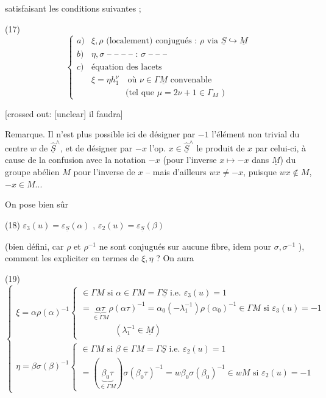 satisfaisant les conditions suivantes ;

\newpage


(17) 
$$ \begin{cases} 
a) & \xi, \rho \text{ (localement) conjugués : } \rho \text{ via } \underline{S} \hookrightarrow \underline{M} \\ 
b) & \eta, \sigma \text{ -- -- -- -- : } \sigma \text{ -- -- -- } \\ 
c) & \text{équation des lacets} \\ 
& \xi = \eta h_1^\nu \quad \text{où } \nu \in \Gamma \underline{M} \text{ convenable} \\ 
& \quad \quad \quad \quad \text{(tel que } \mu = 2\nu+1 \in \Gamma_M \text{ )} 
\end{cases} $$

[crossed out: [unclear] il faudra]

Remarque. Il n'est plus possible ici de désigner
par $-1$ l'élément non trivial du centre $w$ de
$\widehat{\underline{S}}^\wedge$, et de désigner par $-x$ l'op. $x \in \widehat{\underline{S}}^\wedge$ le
produit de $x$ par celui-ci, à cause de la
confusion avec la notation $-x$ (pour l'inverse $x \mapsto -x$ dans $\underline{M}$)
du groupe abélien $M$ pour l'inverse de $x$ --
mais d'ailleurs $w x \neq -x$, puisque $w x \notin M$, $-x \in M$...

On pose bien sûr

(18) $\varepsilon_3(u) = \varepsilon_{\underline{S}}(\alpha)$ , $\varepsilon_2(u) = \varepsilon_{\underline{S}}(\beta)$

(bien défini, car $\rho$ et $\rho^{-1}$ ne sont conjugués
sur aucune fibre, idem pour $\sigma, \sigma^{-1}$ ),
comment les expliciter en termes de
$\xi, \eta$ ? On aura

(19)
$$ \begin{cases} 
\xi = \alpha \rho(\alpha)^{-1} \begin{cases} 
\in \Gamma M \text{ si } \alpha \in \Gamma M = \Gamma \underline{S} \text{ i.e. } \varepsilon_3(u) = 1 \\ 
= \underbrace{\alpha \tau}_{\in \Gamma M} \rho(\alpha \tau)^{-1} = \alpha_0 (- \lambda_1^{-1}) \rho(\alpha_0)^{-1} \in \Gamma M \text{ si } \varepsilon_3(u) = -1 \\ 
\quad \quad \quad \quad (\lambda_1^{-1} \in \underline{M}) 
\end{cases} \\ 
\eta = \beta \sigma(\beta)^{-1} \begin{cases} 
\in \Gamma M \text{ si } \beta \in \Gamma M = \Gamma \underline{S} \text{ i.e. } \varepsilon_2(u) = 1 \\ 
= (\underbrace{\beta_0 \tau}_{\in \Gamma M}) \sigma(\beta_0 \tau)^{-1} = w \beta_0 \sigma(\beta_0)^{-1} \in w M \text{ si } \varepsilon_2(u) = -1 
\end{cases} 
\end{cases} $$

